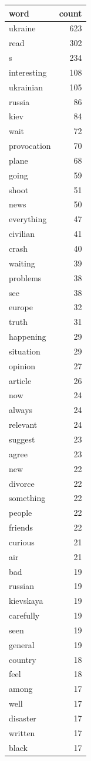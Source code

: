 \begin{tabular}{lr}
\toprule
word & count \\
\midrule
ukraine & 623 \\
read & 302 \\
s & 234 \\
interesting & 108 \\
ukrainian & 105 \\
russia & 86 \\
kiev & 84 \\
wait & 72 \\
provocation & 70 \\
plane & 68 \\
going & 59 \\
shoot & 51 \\
news & 50 \\
everything & 47 \\
civilian & 41 \\
crash & 40 \\
waiting & 39 \\
problems & 38 \\
see & 38 \\
europe & 32 \\
truth & 31 \\
happening & 29 \\
situation & 29 \\
opinion & 27 \\
article & 26 \\
now & 24 \\
always & 24 \\
relevant & 24 \\
suggest & 23 \\
agree & 23 \\
new & 22 \\
divorce & 22 \\
something & 22 \\
people & 22 \\
friends & 22 \\
curious & 21 \\
air & 21 \\
bad & 19 \\
russian & 19 \\
kievskaya & 19 \\
carefully & 19 \\
seen & 19 \\
general & 19 \\
country & 18 \\
feel & 18 \\
among & 17 \\
well & 17 \\
disaster & 17 \\
written & 17 \\
black & 17 \\
\bottomrule
\end{tabular}
